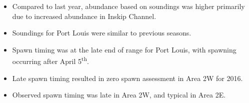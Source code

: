 \begin{itemize}
\item Compared to last year, abundance based on soundings was higher primarily due to increased abundance in Inskip Channel.
\item Soundings for Port Louis were similar to previous seasons.
\item Spawn timing was at the late end of range for Port Louis, with spawning occurring after April 5\textsuperscript{th}.
\item Late spawn timing resulted in zero spawn assessment in Area 2W for 2016.
\item Observed spawn timing was late in Area 2W, and typical in Area 2E.
\end{itemize}
